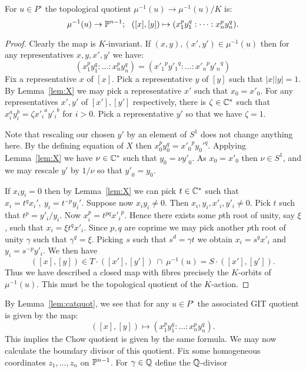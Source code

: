\begin{lemma} \label{lem:3.3}
For \(u \in P^\circ\) the topological quotient \(\mu^{-1}(u) \to \mu^{-1}(u)/K \) is:
\[
\mu^{-1}(u) \to \PP^{n-1}; \ \ ([x],[y]) \mapsto (x_1^p y_1^q: \dots : x_n^p y_n^q ).
\]
\end{lemma}
%
%
%
\begin{proof}
Clearly the map is \(K\)-invariant. If \((x,y), ({x'},{y'}) \in \mu^{-1}(u)\) then for any representatives \(x,y,{x'},{y'}\) we have:
\[
(x_1^p y_1^q: \dots : x_n^p y_n^q) = ({x'_1}^p {y'_1}^q: \dots : {x'_n}^p {y'_n}^q)
\]
Fix a representative \(x\) of \([x]\). Pick a representative \(y\) of \([y]\) such that \(|x||y| = 1\). By Lemma~\ref{lem:X} we may pick a representative \({x'}\) such that \(x_0 = {{x'_0}}\). For any representatives \({x'},{y'}\) of \([x'],[y']\) respectively, there is \(\zeta \in \mathbb{C}^*\) such that \( x_i^a y_i^b = \zeta {{x'_i}}^a {{y'_i}}^b\) for \(i>0\). Pick a representative \(y'\) so that we have \(\zeta = 1\).

Note that rescaling our chosen \(y'\) by an element of \(S^1\) does not change anything here. By the defining equation of \(X\) then  \(x_0^p y_0^q = {x'_0}^p {y_0'}^q \). Applying Lemma~\ref{lem:X} we have \(\nu \in \mathbb{C}^*\) such that \(y_0 = \nu {y'}_0\). As \(x_0 = {x'}_0\) then \(\nu \in S^1\), and we may rescale \({y'}\) by \(1/\nu\) so that \({y'}_0 = y_0\).

If \(x_iy_i = 0\) then by Lemma~\ref{lem:X} we can pick \(t \in \mathbb{C}^*\) such that \(x_i = t^q x_i', \ y_i = t^{-p} y_i'\). Suppose now \(x_iy_i \neq 0\). Then \(x_i,y_i,{x'_i},{y'_i} \neq 0\). Pick \(t\) such that \(t^p = {y'_i}/y_i\). Now \(x_i^p = t^{p q} {x'_i}^p\). Hence there exists some \(p\)th root of unity, say \(\xi\), such that \(x_i = \xi t^q {x'_i}\). Since \(p,q\) are coprime we may pick another \(p\)th root of unity \(\gamma\) such that \(\gamma^q = \xi\). Picking \(s\) such that \(s^d = \gamma t\) we obtain \(x_i = s^q {x'}_i\) and \(y_i = s^{-p} {y'_i}\). We then have
\[
([x],[y]) \in T \cdot ([x'],[y']) \ \cap \ \mu^{-1}(u) = S \cdot ([x'],[y']).
\]
Thus we have described a closed map with fibres precisely the \(K\)-orbits of \(\mu^{-1}(u)\). This must be the topological quotient of the \(K\)-action.
\end{proof}
%
%
%
By Lemma~\ref{lem:catquot}, we see that for any \(u \in P^\circ\) the associated GIT quotient is given by the map:
\[
([x],[y]) \mapsto (x_1^p y_1^q: \dots : x_n^p y_n^q).
\]
This implies the Chow quotient is given by the same formula. We may now calculate the boundary divisor of this quotient. Fix some homogeneous coordinates \(z_1,\dots,z_n\) on \(\mathbb{P}^{n-1}\). For \(\gamma \in \mathbb{Q}\) define the \(\mathbb{Q}\)-divisor

